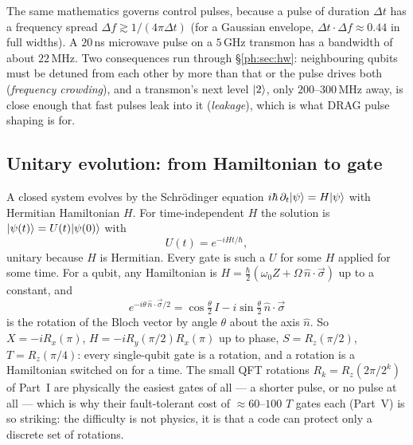 The same mathematics governs control pulses, because a pulse of duration $\Delta t$ has a
frequency spread $\Delta f\gtrsim1/(4\pi\Delta t)$ (for a Gaussian envelope,
$\Delta t\cdot\Delta f\approx0.44$ in full widths). A $20$\,ns microwave pulse on a $5$\,GHz
transmon has a bandwidth of about $22$\,MHz. Two consequences run through
\S\ref{ph:sec:hw}: neighbouring qubits must be detuned from each other by more than that or the
pulse drives both (\emph{frequency crowding}), and a transmon's next level $\lvert 2 \rangle$, only
$200$--$300$\,MHz away, is close enough that fast pulses leak into it (\emph{leakage}),
which is what DRAG pulse shaping is for.

\subsection{Unitary evolution: from Hamiltonian to gate}\label{ph:sec:unitary}

A closed system evolves by the Schr\"odinger equation
$i\hbar\,\partial_t\lvert \psi \rangle=H\lvert \psi \rangle$ with Hermitian Hamiltonian $H$. For time-independent
$H$ the solution is $\lvert \psi(t) \rangle=U(t)\lvert \psi(0) \rangle$ with
\[ U(t)=e^{-iHt/\hbar}, \]
unitary because $H$ is Hermitian. Every gate is such a $U$ for some $H$ applied for some time.
For a qubit, any Hamiltonian is $H=\tfrac{\hbar}{2}(\omega_0Z+\Omega\,\hat n\cdot\vec\sigma)$
up to a constant, and
\[ e^{-i\theta\,\hat n\cdot\vec\sigma/2}=\cos\tfrac\theta2\,I-i\sin\tfrac\theta2\,\hat n\cdot\vec\sigma \]
is the rotation of the Bloch vector by angle $\theta$ about the axis $\hat n$. So $X=-iR_x(\pi)$,
$H=-iR_y(\pi/2)R_x(\pi)$ up to phase, $S=R_z(\pi/2)$, $T=R_z(\pi/4)$: every single-qubit gate is a
rotation, and a rotation is a Hamiltonian switched on for a time. The small QFT rotations
$R_k=R_z(2\pi/2^k)$ of Part~I are physically the easiest gates of all --- a shorter pulse, or no
pulse at all --- which is why their fault-tolerant cost of $\approx60$--$100$ $T$ gates each
(Part~V) is so striking: the difficulty is not physics, it is that a code can protect only a
discrete set of rotations.

